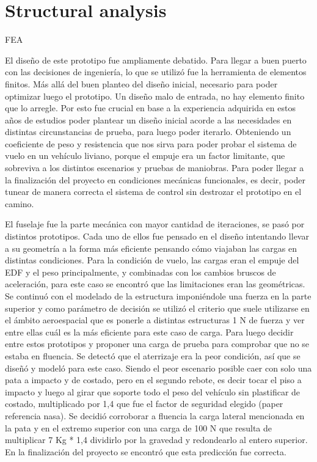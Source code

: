 \section{Structural analysis}\label{sec:fea}

FEA

El diseño de este prototipo fue ampliamente debatido. Para llegar a buen puerto con las decisiones de ingeniería, lo que se utilizó fue la herramienta de elementos finitos. Más allá del buen planteo del diseño inicial, necesario para poder optimizar luego el prototipo. Un diseño malo de entrada, no hay elemento finito que lo arregle. Por esto fue crucial en base a la experiencia adquirida en estos años de estudios poder plantear un diseño inicial acorde a las necesidades en distintas circunstancias de prueba, para luego poder iterarlo. Obteniendo un coeficiente de peso y resistencia que nos sirva para poder probar el sistema de vuelo en un vehículo liviano, porque el empuje era un factor limitante, que sobreviva a los distintos escenarios y pruebas de maniobras. Para poder llegar a la finalización del proyecto en condiciones mecánicas funcionales, es decir, poder tunear de manera correcta el sistema de control sin destrozar el prototipo en el camino.

El fuselaje fue la parte mecánica con mayor cantidad de iteraciones, se pasó por distintos prototipos. Cada uno de ellos fue pensado en el diseño intentando llevar a su geometría a la forma más eficiente pensando cómo viajaban las cargas en distintas condiciones. Para la condición de vuelo, las cargas eran el empuje del EDF y el peso  principalmente, y combinadas con los cambios bruscos de aceleración, para este caso se encontró que las limitaciones eran las geométricas. Se continuó con el modelado de la estructura imponiéndole una fuerza en la parte superior y como parámetro de decisión se utilizó el criterio que suele utilizarse en el ámbito aeroespacial que es ponerle a distintas estructuras 1 N de fuerza y ver entre ellas cuál es la más eficiente para este caso de carga. Para luego decidir entre estos prototipos y proponer una carga de prueba para comprobar que no se estaba en fluencia. Se detectó que el aterrizaje era la peor condición, así que se diseñó y modeló para este caso. Siendo el peor escenario posible caer con solo una pata a impacto y de costado, pero en el segundo rebote, es decir tocar el piso a impacto y luego al girar que soporte todo el peso del vehículo sin plastificar de costado, multiplicado por 1,4 que fue el factor de seguridad elegido (paper referencia nasa). Se decidió corroborar a fluencia la carga lateral mencionada en la pata y en el extremo superior con una carga de 100 N que resulta de multiplicar 7 Kg * 1,4 dividirlo por la gravedad y redondearlo al entero superior. En la finalización del proyecto se encontró que esta predicción fue correcta.

